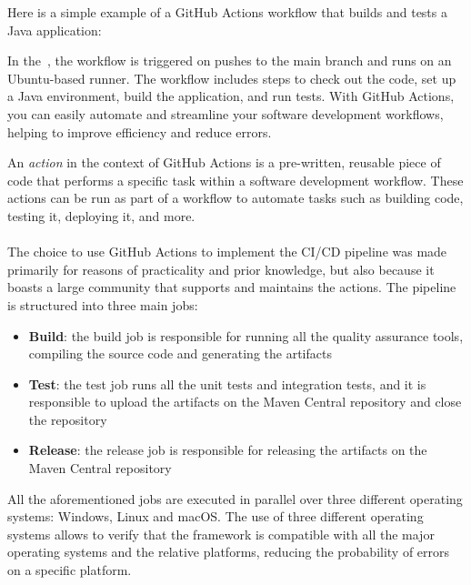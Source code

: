 Here is a simple example of a GitHub Actions workflow that builds and tests a Java application:



In the~, the workflow is triggered on pushes to the main branch and runs on an Ubuntu-based runner. The workflow
includes steps to check out the code, set up a Java environment, build the application, and run tests. With GitHub Actions, you can easily
automate and streamline your software development workflows, helping to improve efficiency and reduce errors.

An \emph{action} in the context of GitHub Actions is a pre-written, reusable piece of code that performs a specific task within a software development
workflow. These actions can be run as part of a workflow to automate tasks such as building code, testing it, deploying it, and more.

\paragraph*{}

The choice to use GitHub Actions to implement the CI/CD pipeline was made primarily for reasons of practicality and prior knowledge, but also because
it boasts a large community that supports and maintains the actions.
The pipeline is structured into three main jobs:

\begin{itemize}
	\item \textbf{Build}: the build job is responsible for running all the quality assurance tools, compiling the source code and generating the
	      artifacts
	\item \textbf{Test}: the test job runs all the unit tests and integration tests, and it is responsible to upload the artifacts on the
	      Maven Central repository and close the repository
	\item \textbf{Release}: the release job is responsible for releasing the artifacts on the Maven Central repository
\end{itemize}

All the aforementioned jobs are executed in parallel over three different operating systems: Windows, Linux and macOS.
The use of three different operating systems allows to verify that the framework is compatible with all the major operating systems and the relative
platforms, reducing the probability of errors on a specific platform.

